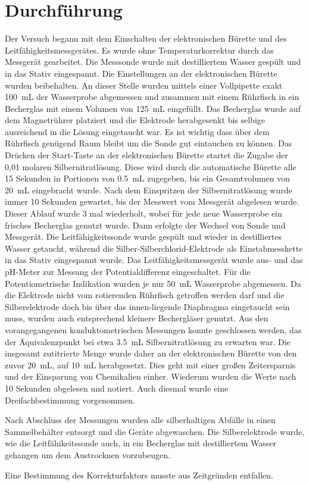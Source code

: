 \section{Durchführung}
\label{sec:durchfuerung}

Der Versuch begann mit dem Einschalten der elektronischen Bürette und des Leitfähigkeitsmessgerätes. Es wurde ohne Temperaturkorrektur durch das Messgerät gearbeitet. Die Messsonde wurde mit destilliertem Wasser gespült und in das Stativ eingespannt. Die Einstellungen an der elektronischen Bürette wurden beibehalten. An dieser Stelle wurden mittels einer Vollpipette exakt \SI{100}{\milli\liter} der Wasserprobe abgemessen und zusammen mit einem Rührfisch in ein Becherglas mit einem Volumen von \SI{125}{\milli\liter} eingefüllt. Das Becherglas wurde auf dem Magnetrührer platziert und die Elektrode herabgesenkt bis selbige ausreichend in die Lösung eingetaucht war. Es ist wichtig dass über dem Rührfisch genügend Raum bleibt um die Sonde gut eintauchen zu können. Das Drücken der Start-Taste an der elektronischen Bürette startet die Zugabe der 0,01 molaren Silbernitratlösung. Diese wird durch die automatische Bürette alle 15 Sekunden in Portionen von \SI{0,5}{\milli\liter} zugegeben, bis ein Gesamtvolumen von \SI{20}{\milli\liter} eingebracht wurde. Nach dem Einspritzen der Silbernitratlösung wurde immer 10 Sekunden gewartet, bis der Messwert vom Messgerät abgelesen wurde. Dieser Ablauf wurde 3 mal wiederholt, wobei für jede neue Wasserprobe ein frisches Becherglas genutzt wurde. Dann erfolgte der Wechsel von Sonde und Messgerät. Die Leitfähigkeitssonde wurde gespült und wieder in destilliertes Wasser getaucht, während die Silber-Silberchlorid-Elektrode als Einstabmesskette in das Stativ eingespannt wurde. Das Leitfähigkeitsmessgerät wurde aus- und das pH-Meter zur Messung der Potentialdifferenz eingeschaltet. Für die Potentiometrische Indikation wurden je nur \SI{50}{\milli\liter} Wasserprobe abgemessen. Da die Elektrode  nicht vom rotierenden Rührfisch getroffen werden darf und die Silberelektrode doch bis über das innen-liegende Diaphragma eingetaucht sein muss, wurden auch entsprechend kleinere Bechergläser genutzt. Aus den vorangegangenen konduktometrischen Messungen konnte geschlossen werden, das der Äquivalenzpunkt bei etwa \SI{3,5}{\milli\liter} Silbernitratlösung zu erwarten war. Die insgesamt zutitrierte Menge wurde daher an der elektronischen Bürette von den zuvor \SI{20}{\milli\liter}, auf \SI{10}{\milli\liter} herabgesetzt. Dies geht mit einer großen Zeitersparnis und der Einsparung von Chemikalien einher. Wiederum wurden die Werte nach 10 Sekunden abgelesen und notiert. Auch diesmal wurde eine Dreifachbestimmung vorgenommen.

Nach Abschluss der Messungen wurden alle silberhaltigen Abfälle in einen Sammelbehälter entsorgt und die Geräte abgewaschen. Die Silberelektrode wurde, wie die Leitfähikeitssonde auch, in ein Becherglas mit destilliertem Wasser gehangen um dem Austrocknen vorzubeugen.

Eine Bestimmung des Korrekturfaktors musste aus Zeitgründen entfallen.
